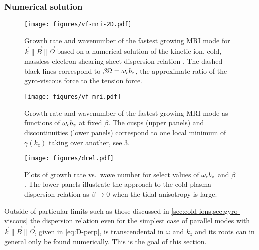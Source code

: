 \documentclass[aps,pre,notitlepage,amsmath,amssymb,amsfonts,nobibnotes,nofootinbib,superscriptaddress]{revtex4-1}
\begin{document}
\subsubsection{Numerical solution}

\begin{figure}
  \centering\texttt{[image: figures/vf-mri-2D.pdf]}
  \caption{Growth rate and wavenumber of the fastest growing MRI mode for
    $\vec{k}\bm{\parallel}\vec{B}\bm{\parallel}\vec{\Omega}$ based on a
    numerical solution of the kinetic ion, cold, massless electron shearing
    sheet dispersion relation . The dashed black lines
    correspond to $\beta\Omega=\omega_c{}b_z$, the approximate ratio of the
    gyro-viscous force to the tension force.}\label{fig:vf-mri-2D}
\end{figure}

\begin{figure}
  \centering\texttt{[image: figures/vf-mri.pdf]}
  \caption{Growth rate and wavenumber of the fastest growing MRI mode as
    functions of $\omega_c{}b_z$ at fixed $\beta$. The cusps (upper panels) and
    discontinuities (lower panels) correspond to one local minimum of
    $\gamma(k_z)$ taking over another, see \cref{fig:drel}.}\label{fig:vf-mri}
\end{figure}

\begin{figure}
  \centering\texttt{[image: figures/drel.pdf]}
  \caption{Plots of
    growth rate vs.\ wave number for select values of $\omega_c{}b_z$ and $\beta$.
    The lower panels illustrate the approach to the cold plasma dispersion
    relation as $\beta\to0$ when the tidal anisotropy is
    large.}\label{fig:drel}
\end{figure}

Outside of particular limits such as those discussed in
\cref{sec:cold-ions,sec:gyro-viscous} the dispersion relation even for the
simplest case of parallel modes with
$\vec{k}\bm{\parallel}\vec{B}\bm{\parallel}\vec{\Omega}$, given in
\cref{eq:D-perp}, is transcendental in $\omega$ and $k_z$ and its roots can in
general only be found numerically. This is the goal of this section.
\end{document}
